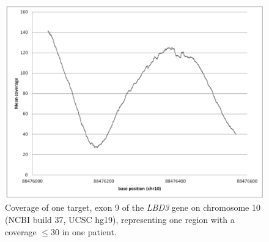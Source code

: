 \begin{figure}[!ht]
	\includegraphics[width=1.0\linewidth]{img/SNP_Indel_Fig2}
	\caption[Coverage profile of single target \textit{LDB3} exon 9]{Coverage of one target, exon 9 of the \textit{LBD3} gene on chromosome 10 (NCBI build 37, UCSC hg19), representing one region with a coverage  $\le$30 in one patient.}
	\label{fig:SNP_Indel_Fig2}
\end{figure}


